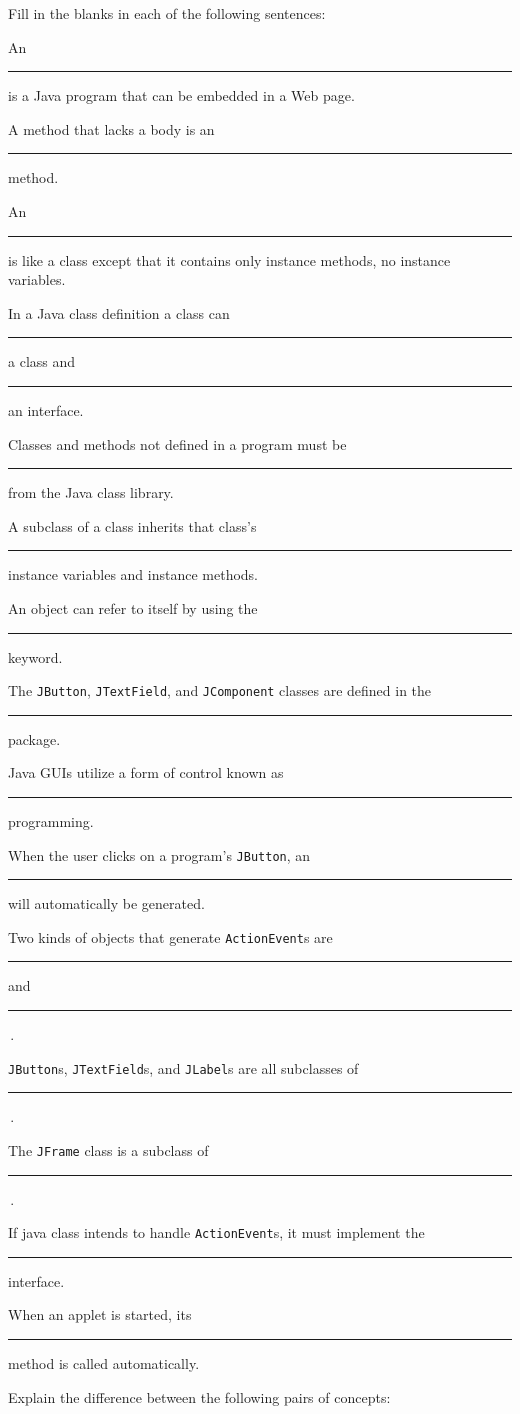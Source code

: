 \begin{EXRtwo}

\item  Fill in the blanks in each of the following sentences:

\begin{EXRtwoLL}
\baselineskip=13pt\item  An  \rule{40pt}{0.5pt} is a Java program that can be embedded in a Web page.
\item  A method that lacks a body is an \rule{40pt}{0.5pt} method.
\item  An \rule{40pt}{0.5pt} is like a class except that it contains
only instance methods, no instance variables.
\item  In a Java class definition a class can \rule{40pt}{0.5pt}
a class and \rule{40pt}{0.5pt}  an interface.
\item  Classes and methods not defined in a program must be \rule{40pt}{0.5pt}
 from the Java class library.
\item  A subclass of a class inherits that class's \rule{40pt}{0.5pt} instance variables and instance methods.
\item  An object can refer to itself by using the \rule{40pt}{0.5pt} keyword.
\item  The {\tt JButton}, {\tt JTextField}, and {\tt JComponent} classes
are defined in the  \rule{40pt}{0.5pt} package.
\item  Java GUIs utilize a form of control known as \rule{40pt}{0.5pt}  programming.
\item  When the user clicks on a program's {\tt JButton}, an
  \rule{40pt}{0.5pt} will automatically be generated.
\item  Two kinds of objects that generate {\tt ActionEvent}s are \rule{40pt}{0.5pt} and
\rule{40pt}{0.5pt}\,.
\item  {\tt JButton}s, {\tt JTextField}s, and
{\tt JLabel}s are all subclasses of \rule{40pt}{0.5pt}\,.
\item  The {\tt JFrame} class is a subclass of  \rule{40pt}{0.5pt}\,.
\item  If java class intends to handle {\tt ActionEvent}s, it must
implement the \rule{40pt}{0.5pt} interface.
\item  When an applet is started, its  \rule{40pt}{0.5pt} method is called
automatically.
\end{EXRtwoLL}

\baselineskip=11pt\item  Explain the difference between the following pairs of
concepts:


\end{EXRtwo}

